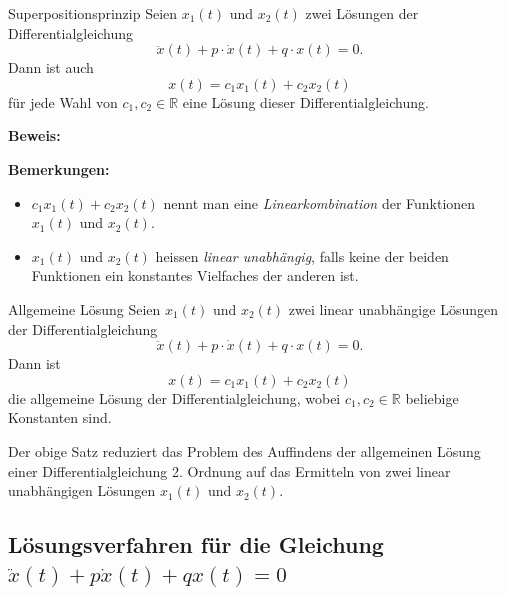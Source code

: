\begin{satz}{Superpositionsprinzip}{}
    Seien \(x_1(t)\) und \(x_2(t)\) zwei Lösungen der Differentialgleichung
    \[
        \ddot{x}(t)+p\cdot\dot{x}(t)+q\cdot x(t)=0.
    \]
    Dann ist auch
    \[
        x(t)=c_1x_1(t)+c_2x_2(t)
    \]
    für jede Wahl von \(c_1,c_2\in\mathbb{R}\) eine Lösung
    dieser Differentialgleichung.
\end{satz}

\textbf{Beweis:}
\clearpage
\vspace{3cm}

\textbf{Bemerkungen:}

\begin{itemize}
    \item \(c_1x_1(t)+c_2x_2(t)\) nennt man eine
          \emph{Linearkombination} der Funktionen \(x_1(t)\) und \(x_2(t)\).

    \item \(x_1(t)\) und \(x_2(t)\) heissen \emph{linear unabhängig},
          falls keine der beiden Funktionen ein konstantes Vielfaches
          der anderen ist.
\end{itemize}

\begin{satz}{Allgemeine Lösung}{}
    Seien \(x_1(t)\) und \(x_2(t)\) zwei linear unabhängige Lösungen
    der Differentialgleichung
    \[
        \ddot{x}(t)+p\cdot\dot{x}(t)+q\cdot x(t)=0.
    \]
    Dann ist
    \[
        x(t)=c_1x_1(t)+c_2x_2(t)
    \]
    die allgemeine Lösung der Differentialgleichung,
    wobei \(c_1,c_2\in\mathbb{R}\) beliebige Konstanten sind.
\end{satz}

Der obige Satz reduziert das Problem des Auffindens der allgemeinen
Lösung einer Differentialgleichung 2. Ordnung auf das Ermitteln
von zwei linear unabhängigen Lösungen \(x_1(t)\) und \(x_2(t)\).
















\clearpage
\subsection{Lösungsverfahren für die Gleichung
    \texorpdfstring{\(\ddot{x}(t)+p\dot{x}(t)+qx(t)=0\)}{x''+px'+qx=0}}


